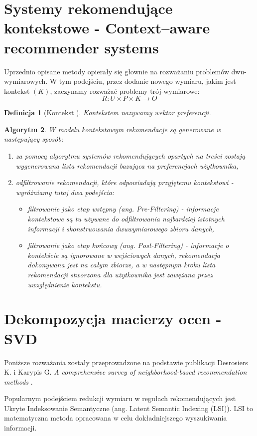 \documentclass[12pt,a4paper]{report}
\newtheorem{df}{Definicja}[chapter]
\newtheorem{algorytm}[df]{Algorytm}
\newcommand{\setUzytkownicy}{\mathit{U}}
\newcommand{\setPrzedmioty}{\mathit{P}}
\newcommand{\setOceny}{\mathit{O}}
\newcommand{\setKontekst}{\mathit{K}}
\begin{document}
\section{Systemy rekomendujące kontekstowe - Context–aware recommender systems}

Uprzednio opisane metody opierały się głownie na rozważaniu problemów dwu-wymiarowych. W tym podejściu, przez dodanie nowego wymiaru, jakim jest kontekst $(K)$, zaczynamy rozważać problemy trój-wymiarowe:
$$
R: \setUzytkownicy \times \setPrzedmioty \times \setKontekst  \rightarrow \setOceny
$$
\begin{df}[Kontekst {\citep[Sec 3.3.1.1]{rsh}}]
Kontekstem nazywamy wektor preferencji.
\end{df}

\begin{algorytm}
W modelu kontekstowym rekomendacje są generowane w następujący sposób:
\begin{enumerate}
\item za pomocą algorytmu systemów rekomendujących opartych na treści zostają wygenerowana lista rekomendacji bazująca na  preferencjach użytkownika,
\item odfiltrowanie rekomendacji, które odpowiadają przyjętemu kontekstowi - 
wyróżniamy tutaj dwa podejścia:
\begin{itemize}
\item filtrowanie jako etap wstępny (ang. Pre-Filtering) - informacje kontekstowe są tu używane do odfiltrowania najbardziej istotnych informacji i skonstruowania dwuwymiarowego zbioru danych,
\item filtrowanie jako etap końcowy (ang. Post-Filtering) - informacje o kontekście są ignorowane w wejściowych danych, rekomendacja dokonywana jest na całym zbiorze, a w następnym kroku lista rekomendacji stworzona dla użytkownika jest zawężana przez uwzględnienie kontekstu.
\end{itemize}
\end{enumerate}
\end{algorytm}

\section{Dekompozycja macierzy ocen - SVD}
Poniższe rozważania zostały przeprowadzone na podstawie publikacji Desrosiers K. i Karypis G. \textit{A comprehensive survey of neighborhood-based recommendation methods} {\citep[Sec 4.1.1]{acsonbrs}}.

Popularnym podejściem redukcji wymiaru w regułach rekomendujących jest Ukryte Indeksowanie Semantyczne (ang. Latent Semantic Indexing (LSI)). LSI to matematyczna metoda opracowana w celu dokładniejszego wyszukiwania informacji.
\end{document}

